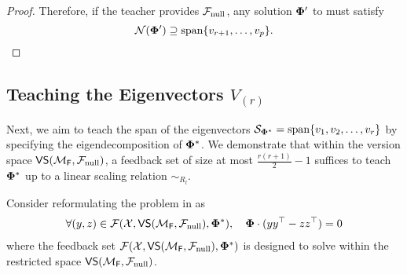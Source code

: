 \begin{proof}
    Therefore, if the teacher provides ${\mathcal{F}}_{\text{null}}$, any solution $\boldsymbol{\Phi}'$ to  must satisfy
    \[
        \mathcal{N}(\boldsymbol{\Phi}') \supseteq \text{span}\{v_{r+1}, \ldots, v_p\}.
    \]
\end{proof}

\subsection{Teaching the Eigenvectors $V_{(r)}$}

Next, we aim to teach the span of the eigenvectors $\mathcal{S}_{\boldsymbol{\Phi}^*} = \text{span}\{v_1, v_2, \ldots, v_r\}$ by specifying the eigendecomposition of $\boldsymbol{\Phi}^*$. We demonstrate that within the version space $\textsf{VS}({\mathcal{M}}_{\textsf{F}}, {\mathcal{F}}_{\text{null}})$, a feedback set of size at most $\frac{r(r+1)}{2} - 1$ suffices to teach $\boldsymbol{\Phi}^*$ up to a linear scaling relation $\sim_{R_l}$.

Consider reformulating the problem in  as
\begin{align}
    \forall (y, z) \in \mathcal{F}(\mathcal{X}, \textsf{VS}({\mathcal{M}}_{\textsf{F}}, {\mathcal{F}}_{\text{null}}), \boldsymbol{\Phi}^*), \quad \boldsymbol{\Phi} \cdot (yy^{\top} - zz^{\top}) = 0 \label{eq:redorthosat}
\end{align}
where the feedback set $\mathcal{F}(\mathcal{X}, \textsf{VS}({\mathcal{M}}_{\textsf{F}}, {\mathcal{F}}_{\text{null}}), \boldsymbol{\Phi}^*)$ is designed to solve within the restricted space $\textsf{VS}({\mathcal{M}}_{\textsf{F}}, {\mathcal{F}}_{\text{null}})$.

